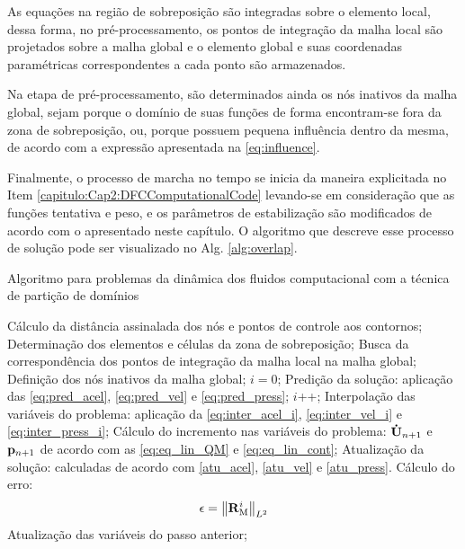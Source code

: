 As equações na região de sobreposição são integradas sobre o elemento local, dessa forma, no pré-processamento, os pontos de integração da malha local são projetados sobre a malha global e o elemento global e suas coordenadas paramétricas correspondentes a cada ponto são armazenados. 

Na etapa de pré-processamento, são determinados ainda os nós inativos da malha global, sejam porque o domínio de suas funções de forma encontram-se fora da zona de sobreposição, ou, porque possuem pequena influência dentro da mesma, de acordo com a expressão apresentada na \autoref{eq:influence}.

Finalmente, o processo de marcha no tempo se inicia da maneira explicitada no Item \ref{capitulo:Cap2:DFCComputationalCode} levando-se em consideração que as funções tentativa e peso, e os parâmetros de estabilização são modificados de acordo com o apresentado neste capítulo. O algoritmo que descreve esse processo de solução pode ser visualizado no Alg. \ref{alg:overlap}.

\begin{algorithm}
	\caption{Algoritmo para problemas da dinâmica dos fluidos computacional com a técnica de partição de domínios}
	\label{alg:overlap}
	\begin{algorithmic}[1]
		\State Cálculo da distância assinalada dos nós e pontos de controle aos contornos;
		\State Determinação dos elementos e células da zona de sobreposição;
		\State Busca da correspondência dos pontos de integração da malha local na malha global;
		\State Definição dos nós inativos da malha global;
		\State $i=0$;
		\State Predição da solução: aplicação das \autoref{eq:pred_acel}, \autoref{eq:pred_vel} e \autoref{eq:pred_press};
		\State $i$++;
		\State Interpolação das variáveis do problema: aplicação da \autoref{eq:inter_acel_i}, \autoref {eq:inter_vel_i} e \autoref{eq:inter_press_i};
		\State Cálculo do incremento nas variáveis do problema: $\mathbf{\dot{U}}_{n+1}$ e $\mathbf{p}_{n+1}$ de acordo com as \autoref{eq:eq_lin_QM} e \autoref{eq:eq_lin_cont};
		\State Atualização da solução: calculadas de acordo com \autoref{atu_acel}, \autoref{atu_vel} e \autoref{atu_press}.
		\State Cálculo do erro:
		\begin{align}
			\epsilon =\left\| \mathbf{R}_\mathrm{M}^i \right\|_{L^2}
		\end{align}
		\EndWhile
		\State Atualização das variáveis do passo anterior;
		\EndFor
	\end{algorithmic}
\end{algorithm}

